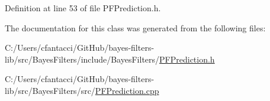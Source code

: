 Definition at line 53 of file P\+F\+Prediction.\+h.



The documentation for this class was generated from the following files\+:\begin{DoxyCompactItemize}
\item 
C\+:/\+Users/cfantacci/\+Git\+Hub/bayes-\/filters-\/lib/src/\+Bayes\+Filters/include/\+Bayes\+Filters/\mbox{\hyperlink{PFPrediction_8h}{P\+F\+Prediction.\+h}}\item 
C\+:/\+Users/cfantacci/\+Git\+Hub/bayes-\/filters-\/lib/src/\+Bayes\+Filters/src/\mbox{\hyperlink{PFPrediction_8cpp}{P\+F\+Prediction.\+cpp}}\end{DoxyCompactItemize}
